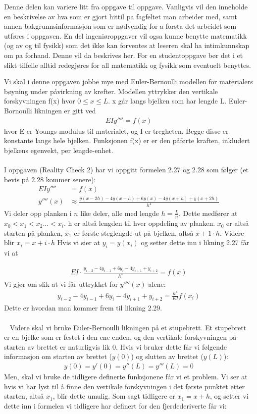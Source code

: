 Denne delen kan variere litt fra oppgave til oppgave. Vanligvis vil den inneholde en beskrivelse av hva som er gjort hittil pa fagfeltet man arbeider med, samt annen bakgrunnsinformasjon som er nødvendig for a forsta det arbeidet som utføres i oppgaven. En del ingeniøroppgaver vil ogsa kunne benytte matematikk (og av og til fysikk) som det ikke kan forventes at leseren skal ha intimkunnskap om pa forhand. Denne vil da beskrives her. For en studentoppgave bør det i et slikt tilfelle alltid redegjøres for all matematikk og fysikk som eventuelt benyttes.


Vi skal i denne oppgaven jobbe mye med Euler-Bernoulli modellen for materialers bøyning under påvirkning av krefter. Modellen yttrykker den vertikale forskyvningen f(x) hvor $0\leq x \leq L$. x går langs bjelken som har lengde L. Euler-Bornoulli likningen er gitt ved 
\begin{align}
    EIy''''=f(x)
\end{align}
hvor E er Youngs modulus til materialet, og I er tregheten. Begge disse er konstante langs hele bjelken. Funksjonen f(x) er er den påførte kraften, inkludert bjelkens egenvekt, per lengde-enhet. 
\\ \\
I oppgaven (Reality Check 2) har vi oppgitt formelen 2.27 og 2.28 som følger (et bevis på 2.28 kommer senere): 
\begin{align}
    EIy''''&=f(x) \nonumber \\
    y''''(x)& \approx \frac{y(x-2h)-4y(x-h)+6y(x)-4y(x+h)+y(x+2h)}{h^4}
\end{align}
Vi deler opp planken i $n$ like deler, alle med lengde $h=\frac{L}{n}$. Dette medfører at $x_0<x_1<x_2...<x_i$. h er altså lengden til hver oppdeling av planken. $x_0$ er altså starten på planken, $x_1$ er første steglengde ut på bjelken, altså $x+1\cdot h$. Videre blir $x_i=x+i\cdot h$ Hvis vi sier at $y_i=y(x_i)$ og setter dette inn i likning 2.27 får vi at 

\begin{align}
EI\cdot	\frac{y_{i-2}-4y_{i-1}+6y_i-4y_{i+1}+y_{i+2}}{h^4}=f(x)
\end{align}
Vi gjør om slik at vi får uttrykket for $y''''(x)$ alene: 
\begin{align}
    y_{i-2}-4y_{i-1}+6y_i-4y_{i+1}+y_{i+2}=\frac{h^4}{EI}f(x_i)
\end{align}
Dette er hvordan man kommer frem til likning 2.29. 
\\ \\ 
Videre skal vi bruke Euler-Bernoulli likningen på et stupebrett. Et stupebrett er en bjelke som er festet i den ene enden, og den vertikale forskyvningen på starten av brettet er naturligvis lik 0. Hvis vi bruker dette får vi følgende informasjon om starten av brettet ($y(0)$) og slutten av brettet ($y(L)$):
\begin{align}
    y(0)=y'(0)=y''(L)=y'''(L)=0
\end{align}
Men, skal vi bruke de tidligere definerte funksjonene får vi et problem. Vi ser at hvis vi har lyst til å finne den vertikale forskyvningen i det første punktet etter starten, altså $x_1$, blir dette umulig. Som sagt tidligere er $x_1=x+h$, og setter vi dette inn i formelen vi tidligere har definert for den fjerdederiverte får vi: 

